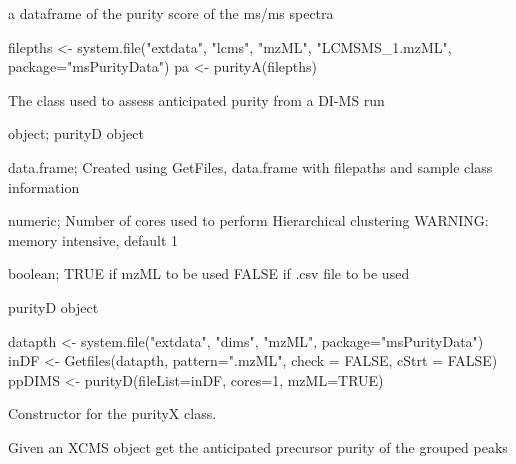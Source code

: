 \documentclass[letterpaper]{book}
\begin{document}
%
\begin{Value}
a dataframe of the purity score of the ms/ms spectra
\end{Value}
%
\begin{SeeAlso}\relax
{}
\end{SeeAlso}
%
\begin{Examples}
\begin{ExampleCode}
filepths <- system.file("extdata", "lcms", "mzML", "LCMSMS_1.mzML", package="msPurityData")
pa <- purityA(filepths)
\end{ExampleCode}
\end{Examples}
%
\begin{Description}\relax
The class used to assess anticipated purity from a DI-MS run
\end{Description}
%
\begin{Arguments}
\begin{ldescription}
\item[\code{.Object}] object; purityD object

\item[\code{fileList}] data.frame; Created using GetFiles, data.frame with filepaths and sample class information

\item[\code{cores}] numeric; Number of cores used to perform Hierarchical clustering WARNING: memory intensive, default 1

\item[\code{mzML}] boolean; TRUE if mzML to be used FALSE if .csv file to be used
\end{ldescription}
\end{Arguments}
%
\begin{Value}
purityD object
\end{Value}
%
\begin{Examples}
\begin{ExampleCode}
datapth <- system.file("extdata", "dims", "mzML", package="msPurityData")
inDF <- Getfiles(datapth, pattern=".mzML", check = FALSE, cStrt = FALSE)
ppDIMS <- purityD(fileList=inDF, cores=1, mzML=TRUE)
\end{ExampleCode}
\end{Examples}
%
\begin{Description}\relax
Constructor for the purityX class.

Given an XCMS object get the anticipated precursor purity of the grouped peaks
\end{Description}
\end{document}
